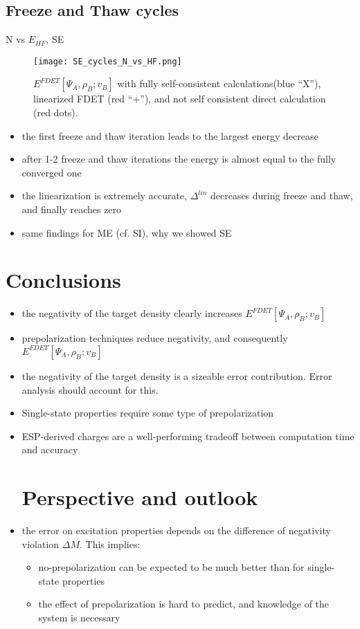 \documentclass[journal=jctcce,manuscript=article, layout=onecolumn]{achemso}
\begin{document}
\subsection{Freeze and Thaw cycles}
N vs $E_{HF}$, SE
\begin{figure}[H]
\centering
\texttt{[image: SE\_cycles\_N\_vs\_HF.png]}
\caption{$E^{FDET}[\Psi_A,\rho_B; v_B]$ with fully self-consistent calculations(blue ``X''), linearized FDET (red ``+''), and not self consistent direct calculation (red dots).}
\label{fig:N_vs_HF_SE}
\end{figure}
\begin{itemize}
 \item the first freeze and thaw iteration leads to the largest energy decrease
 \item after 1-2 freeze and thaw iterations the energy is almost equal to the fully converged one
 \item the linearization is extremely accurate, $\Delta^{lin}$ decreases during freeze and thaw, and finally reaches zero
 \item same findings for ME (cf. SI), why we showed SE
\end{itemize}

\section{Conclusions}
\begin{itemize}
 \item the negativity of the target density clearly increases $E^{FDET}[\Psi_A,\rho_B; v_B]$
 \item prepolarization techniques reduce negativity, and consequently $E^{FDET}[\Psi_A,\rho_B; v_B]$
 \item the negativity of the target density is a sizeable error contribution. Error analysis should account for this.
 \item Single-state properties require some type of prepolarization
 \item ESP-derived charges are a well-performing tradeoff between computation time and accuracy
\section{Perspective and outlook}
 \item the error on excitation properties depends on the difference of negativity violation $\Delta M$. This implies:
    \begin{itemize}
     \item no-prepolarization can be expected to be much better than for single-state properties
     \item the effect of prepolarization is hard to predict, and knowledge of the system is necessary
    \end{itemize}

\end{itemize}
\end{document}
